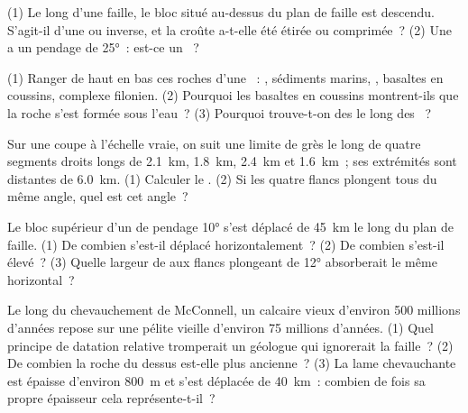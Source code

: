 \begin{exercise}[$\star$]\label{exo:g12:mountain-building:4}
(1) Le long d'une faille, le bloc situé au-dessus du plan de faille est
descendu. S'agit-il d'une  ou inverse, et la croûte a-t-elle
été étirée ou comprimée~? (2) Une  a un pendage de \ang{25}~:
est-ce un ~?
\end{exercise}

\begin{exercise}[$\star$]\label{exo:g12:mountain-building:5}
(1) Ranger de haut en bas ces roches d'une ~: , sédiments
marins, , basaltes en coussins, complexe filonien. (2) Pourquoi
les basaltes en coussins montrent-ils que la roche s'est formée sous
l'eau~? (3) Pourquoi trouve-t-on des  le long des ~?
\end{exercise}

\begin{exercise}[$\star\star$]\label{exo:g12:mountain-building:6}
Sur une coupe à l'échelle vraie, on suit une limite de grès le long de
quatre segments droits longs de \qty{2.1}{km}, \qty{1.8}{km}, \qty{2.4}{km}
et \qty{1.6}{km}~; ses extrémités sont distantes de \qty{6.0}{km}.
(1) Calculer le . (2) Si les quatre flancs plongent tous du
même angle, quel est cet angle~?
\end{exercise}

\begin{exercise}[$\star\star$]\label{exo:g12:mountain-building:7}
Le bloc supérieur d'un  de pendage \ang{10} s'est déplacé de
\qty{45}{km} le long du plan de faille. (1) De combien s'est-il déplacé
horizontalement~? (2) De combien s'est-il élevé~? (3) Quelle largeur de
 aux flancs plongeant de \ang{12} absorberait le même 
horizontal~?
\end{exercise}

\begin{exercise}[$\star\star$]\label{exo:g12:mountain-building:8}
Le long du chevauchement de McConnell, un calcaire vieux d'environ 500
millions d'années repose sur une pélite vieille d'environ 75 millions
d'années. (1) Quel principe de datation relative tromperait un géologue
qui ignorerait la faille~? (2) De combien la roche du dessus est-elle plus
ancienne~? (3) La lame chevauchante est épaisse d'environ \qty{800}{m} et
s'est déplacée de \qty{40}{km}~: combien de fois sa propre épaisseur cela
représente-t-il~?
\end{exercise}

